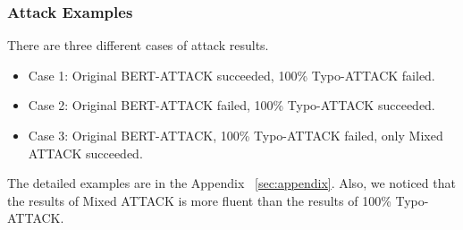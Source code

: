 \documentclass[11pt,a4paper]{article}
\begin{document}
\subsubsection{Attack Examples}
There are three different cases of attack results.
\begin{itemize}
\item Case 1: Original BERT-ATTACK succeeded, 100\% Typo-ATTACK failed.
\item Case 2: Original BERT-ATTACK failed, 100\% Typo-ATTACK succeeded.
\item Case 3: Original BERT-ATTACK, 100\% Typo-ATTACK failed, only Mixed ATTACK succeeded.
\end{itemize}

The detailed examples are in the Appendix ~\ref{sec:appendix}.
Also, we noticed that the results of Mixed ATTACK is more fluent than the results of 100\% Typo-ATTACK.
\end{document}

